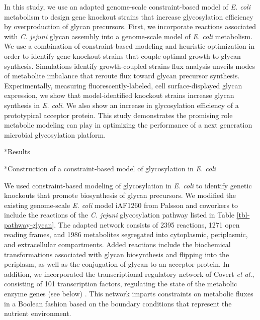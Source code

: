 \documentclass[12pt]{article}
\makeatletter
\renewcommand\subsection{\@startsection
	{subsection}{2}{0mm}
	{-0.05in}
	{-0.5\baselineskip}
	{\normalfont\normalsize\bfseries}}
\renewcommand\section{\@startsection
	{subsection}{2}{0mm}
	{-0.2in}
	{0.05\baselineskip}
	{\normalfont\large\bfseries}}
\makeatother
\begin{document}
In this study, we use an adapted genome-scale constraint-based model of \textit{E. coli} metabolism to design gene knockout strains that increase glycosylation efficiency by overproduction of glycan precursors. 
First, we incorporate reactions associated with \textit{C. jejuni} glycan assembly into a genome-scale model of \textit{E. coli} metabolism. 
We use a combination of constraint-based modeling and heuristic optimization in order to identify gene knockout strains that couple optimal growth to glycan synthesis. 
Simulations identify growth-coupled strains flux analysis unveils modes of metabolite imbalance that reroute flux toward glycan precursor synthesis. 
Experimentally, measuring fluorescently-labeled, cell surface-displayed glycan expression, we show that model-identified knockout strains increase glycan synthesis in \textit{E. coli}. 
We also show an increase in glycosylation efficiency of a prototypical acceptor protein. 
This study demonstrates the promising role metabolic modeling can play in optimizing the performance of a next generation microbial glycosylation platform. 

\newpage
\section*{Results}

\subsection*{Construction of a constraint-based model of glycosylation in \textit{E. coli}}

We used constraint-based modeling of glycosylation in \textit{E. coli} to identify genetic knockouts that promote biosynthesis of glycan precursors. 
We modified the existing genome-scale \textit{E. coli} model iAF1260 from Palsson and coworkers \cite{2007-feist-reed-hatzimanikatis-palsson-MolSysBio} to include the reactions of the \textit{C. jejuni} glycosylation pathway listed in Table \ref{tbl-pathway-glycan}. 
The adapted network consists of 2395 reactions, 1271 open reading frames, and 1986 metabolites segregated into cytoplasmic, periplasmic, and extracellular compartments. 
Added reactions include the biochemical transformations associated with glycan biosynthesis and flipping into the periplasm, as well as the conjugation of glycan to an acceptor protein. 
In addition, we incorporated the transcriptional regulatory network of Covert \textit{et al.}, consisting of 101 transcription factors, regulating the state of the metabolic enzyme genes (see below) \cite{2004-covert-reed-herrgard-palsson-Nat}. 
This network imparts constraints on metabolic fluxes in a Boolean fashion based on the boundary conditions that represent the nutrient environment. 
\end{document}
